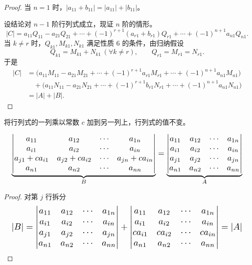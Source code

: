 \begin{proof}
当 $n=1$ 时，$|a_{11}+b_{11}|=|a_{11}|+|b_{11}|$。

设结论对 $n-1$ 阶行列式成立，现证 $n$ 阶的情形。
\[
|C|=a_{11}Q_{11}-a_{21}Q_{21}+\cdots+(-1)^{r+1}(a_{r1}+b_{r1})Q_{r1}+\cdots+(-1)^{n+1}a_{n1}Q_{n1}.
\]
当 $k\ne r$ 时，$Q_{k1},M_{k1},N_{k1}$ 满足性质 6 的条件，由归纳假设
\[
Q_{k1}=M_{k1}+N_{k1}\ (\forall k\ne r),\qquad Q_{r1}=M_{r1}=N_{r1}.
\]
于是
\begin{align*}
|C|&=\Big(a_{11}M_{11}-a_{21}M_{21}+\cdots+(-1)^{r+1}a_{r1}M_{r1}+\cdots+(-1)^{n+1}a_{n1}M_{n1}\Big)\\
&\quad+\Big(a_{11}N_{11}-a_{21}N_{21}+\cdots+(-1)^{r+1}b_{r1}N_{r1}+\cdots+(-1)^{n+1}a_{n1}N_{n1}\Big)\\
&=|A|+|B|.
\end{align*}
\end{proof}


\begin{proposition}[性质 7]
将行列式的一列乘以常数 $c$ 加到另一列上，行列式的值不变。
\end{proposition}

\[
\resizebox{0.98\linewidth}{!}{$\displaystyle
\underbrace{\begin{vmatrix}
a_{11} & a_{12} & \cdots & a_{1n}\\
a_{i1} & a_{i2} & \cdots & a_{in}\\
a_{j1}+ca_{i1} & a_{j2}+ca_{i2} & \cdots & a_{jn}+ca_{in}\\
a_{n1} & a_{n2} & \cdots & a_{nn}
\end{vmatrix}}_{B}
=\underbrace{\begin{vmatrix}
a_{11} & a_{12} & \cdots & a_{1n}\\
a_{i1} & a_{i2} & \cdots & a_{in}\\
a_{j1} & a_{j2} & \cdots & a_{jn}\\
a_{n1} & a_{n2} & \cdots & a_{nn}
\end{vmatrix}}_{A}$}
\]

\begin{proof}
对第 $j$ 行拆分
\[
\resizebox{0.98\linewidth}{!}{$\displaystyle
|B|=\begin{vmatrix}
a_{11} & a_{12} & \cdots & a_{1n}\\
a_{i1} & a_{i2} & \cdots & a_{in}\\
a_{j1} & a_{j2} & \cdots & a_{jn}\\
a_{n1} & a_{n2} & \cdots & a_{nn}
\end{vmatrix}
+\begin{vmatrix}
a_{11} & a_{12} & \cdots & a_{1n}\\
a_{i1} & a_{i2} & \cdots & a_{in}\\
ca_{i1} & ca_{i2} & \cdots & ca_{in}\\
a_{n1} & a_{n2} & \cdots & a_{nn}
\end{vmatrix}=|A|$}
\]
\end{proof}

